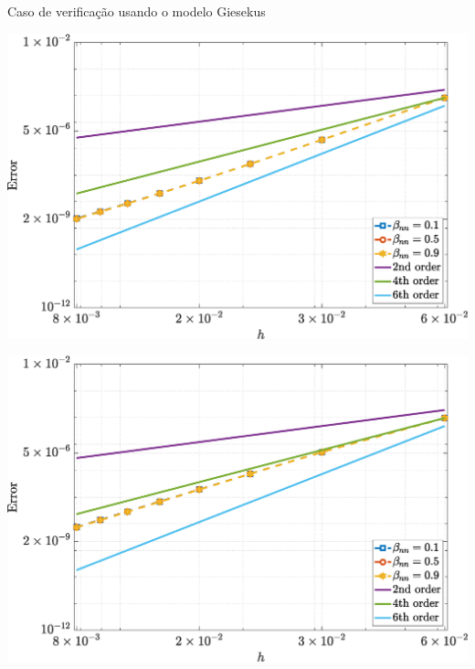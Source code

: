 \begin{frame}{Caso de verificação usando o modelo Giesekus}
    \centering
    \captionsetup{justification=centering}
    \label{fig:giesekus_1}
    \begin{minipage}{0.49\textwidth}
        \centering
        \includegraphics[width=\textwidth]{Figures/NormErr_2nd_Re_100_Wi_1_epsilon_0_xi_0_alphaG_0.1_Dt_1e-06_at_0.05_tipsim_1_MMS_12_U.eps}
        \label{giesekus_u_Case11}
    \end{minipage}
    \hfill
    \begin{minipage}{0.49\textwidth}
        \centering
        \includegraphics[width=\textwidth]{Figures/NormErr_2nd_Re_100_Wi_1_epsilon_0_xi_0_alphaG_0.1_Dt_1e-06_at_0.05_tipsim_1_MMS_12_V.eps}
        \label{giesekus_v_Case11}
    \end{minipage}
\end{frame}

